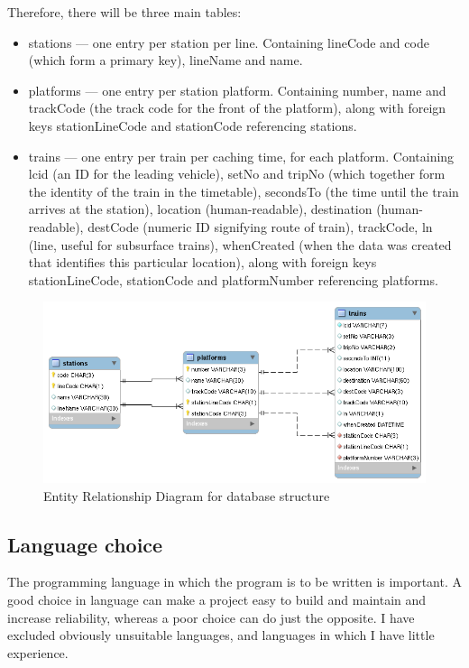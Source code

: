 \documentclass[a4paper,12pt]{article}
\begin{document}
Therefore, there will be three main tables:
\begin{itemize}
  \item stations --- one entry per station per line. Containing lineCode and
    code (which form a primary key), lineName and name.
  \item platforms --- one entry per station platform. Containing number, name
    and trackCode (the track code for the front of the platform), along with
    foreign keys stationLineCode and stationCode referencing stations.
  \item trains --- one entry per train per caching time, for each platform.
    Containing lcid (an ID for the leading vehicle), setNo and tripNo (which
    together form the identity of the train in the timetable), secondsTo (the
    time until the train arrives at the station), location (human-readable),
    destination (human-readable), destCode (numeric ID signifying route of
    train), trackCode, ln (line, useful for subsurface trains), whenCreated
    (when the data was created that identifies this particular location), along
    with foreign keys stationLineCode, stationCode and platformNumber
    referencing platforms.
\end{itemize}

\begin{figure}[h]
  \centering
  \includegraphics[width=\linewidth]{erd}
  \caption{Entity Relationship Diagram for database structure}
  \label{fig:erd}
\end{figure}

\subsection{Language choice}

The programming language in which the program is to be written is important. A
good choice in language can make a project easy to build and maintain and
increase reliability, whereas a poor choice can do just the opposite. I have
excluded obviously unsuitable languages, and languages in which I have little
experience.
\end{document}
